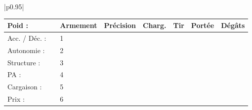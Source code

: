\documentclass[11pt,twoside,a4paper]{article}
\begin{document}
\begin{tabular}{|p{}|}
\begin{tabular}{|p{4.00cm}|p{4.00cm}|p{0.25cm}|p{1.75cm}|p{1.00cm}|p{1.00cm}|p{1.00cm}|p{1.00cm}|p{1.00cm}|}
		Poid : 				&				&	\multicolumn{2}{|p{2.00cm}|}{Armement}	&	
													Pr{\'e}cision		&	Charg.	&	Tir	&	Port{\'e}e	&	D{\'e}g{\^a}ts	\\	\hline
		Acc. / D{\'e}c. : 	&				&	1	&		&			&			&				&				&					\\	\hline
		Autonomie : 		&				&	2	&		&			&			&				&				&					\\	\hline
		Structure : 		&				&	3	&		&			&			&				&				&					\\	\hline
		PA : 				&				&	4	&		&			&			&				&				&					\\	\hline
		Cargaison : 		&				&	5	&		&			&			&				&				&					\\	\hline
		Prix : 				&				&	6	&		&			&			&				&				&					\\	\hline
	\end{tabular} \\
	
		\\
	\hline
	
\end{tabular}

\clearpage
\end{document}
